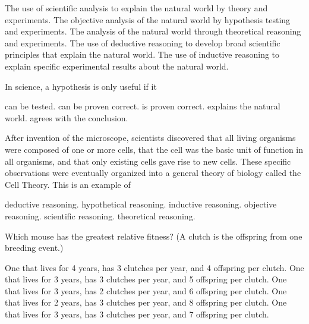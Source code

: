 \begin{choices}
\choice The use of scientific analysis to explain the natural world by theory and experiments.%
\correctchoice The objective analysis of the natural world by hypothesis testing and experiments.%
\choice The analysis of the natural world through theoretical reasoning and experiments.%
\choice The use of deductive reasoning to develop broad scientific principles that explain the natural world.%
\choice The use of inductive reasoning to explain specific experimental results about the natural world.%
\end{choices}


\question
In science, a hypothesis is only useful if it

\begin{choices}
\correctchoice can be tested.%
\choice can be proven correct.%
\choice is proven correct.%
\choice explains the natural world.%
\choice agrees with the conclusion.%
\end{choices}

\question
After invention of the microscope, scientists discovered that all living organisms were composed of one or more cells, that the cell was the basic unit of function in all organisms, and that only existing cells gave rise to new cells. These specific observations were eventually organized into a general theory of biology called the Cell Theory. This is an example of 

\begin{choices}
\choice deductive reasoning.%
\choice hypothetical reasoning.%
\correctchoice inductive reasoning.%
\choice objective reasoning.%
\choice scientific reasoning.%
\choice theoretical reasoning.%
\end{choices}

\question
Which mouse has the greatest relative fitness? (A clutch is the offspring from one breeding event.)

\begin{choices}
\choice One that lives for 4 years, has 3 clutches per year, and 4 offspring per clutch.%
\choice One that lives for 3 years, has 3 clutches per year, and 5 offspring per clutch.%
\choice One that lives for 3 years, has 2 clutches per year, and 6 offspring per clutch. %
\choice One that lives for 2 years, has 3 clutches per year, and 8 offspring per clutch. %
\correctchoice One that lives for 3 years, has 3 clutches per year, and 7 offspring per clutch. %
\end{choices}

